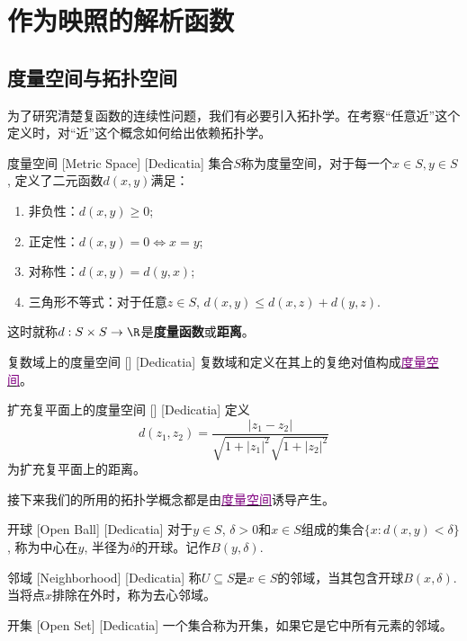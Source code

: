 \documentclass[UTF8]{ctexart}
\newcommand{\hyperrefc}[2]{\hyperref[#1]{\textcolor{purple}{#2}}}
\begin{document}
\section{作为映照的解析函数}
\subsection{度量空间与拓扑空间}
为了研究清楚复函数的连续性问题，我们有必要引入拓扑学。在考察“任意近”这个定义时，对“近”这个概念如何给出依赖拓扑学。
\begin{dfn}
    [UUID]
    {度量空间\label{dfn:MetricSpace}}
    [Metric Space]
    [Dedicatia]
    集合$S$称为度量空间，对于每一个$x\in S, y\in S$, 定义了二元函数$d(x,y)$满足：
    \begin{enumerate}
        \item 非负性：$d(x,y)\geqslant 0$;
        \item 正定性：$d(x,y)=0\Longleftrightarrow x=y$;
        \item 对称性：$d(x,y)=d(y,x)$;
        \item 三角形不等式：对于任意$z\in S$, $d(x,y)\leqslant d(x,z)+d(y,z)$.
    \end{enumerate}
    这时就称$d:S\times S\to \R$是\textbf{度量函数}或\textbf{距离}。
\end{dfn}
\begin{xmp}
    [UUID]
    {复数域上的度量空间}
    []
    [Dedicatia]
    复数域和定义在其上的复绝对值构成\hyperrefc{dfn:MetricSpace}{度量空间}。
\end{xmp}
\begin{xmp}
    [UUID]
    {扩充复平面上的度量空间}
    []
    [Dedicatia]
    定义
    \[d(z_1,z_2)=\frac{|z_1-z_2|}{\sqrt{1+|z_1|^2}\sqrt{1+|z_2|^2}}\]
    为扩充复平面上的距离。
\end{xmp}
接下来我们的所用的拓扑学概念都是由\hyperrefc{dfn:MetricSpace}{度量空间}诱导产生。
\begin{dfn}
    [UUID]
    {开球}
    [Open Ball]
    [Dedicatia]
    对于$y\in S$, $\delta>0$和$x\in S$组成的集合$\{x:d(x,y)<\delta\}$, 称为中心在$y$, 半径为$\delta$的开球。记作$B(y,\delta)$.
\end{dfn}
\begin{dfn}
    [UUID]
    {邻域}
    [Neighborhood]
    [Dedicatia]
    称$U\subseteq S$是$x\in S$的邻域，当其包含开球$B(x,\delta)$. 当将点$x$排除在外时，称为去心邻域。
\end{dfn}
\begin{dfn}
    [UUID]
    {开集}
    [Open Set]
    [Dedicatia]
    一个集合称为开集，如果它是它中所有元素的邻域。
\end{dfn}
\end{document}
